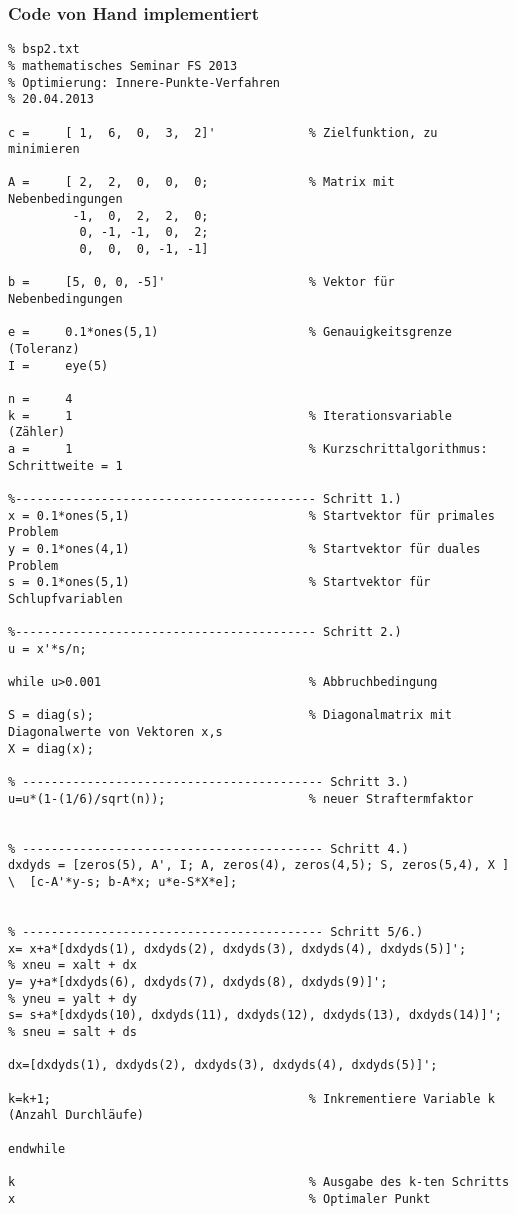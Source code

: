 \subsubsection{Code von Hand implementiert}
\begin{verbatim}
% bsp2.txt
% mathematisches Seminar FS 2013
% Optimierung: Innere-Punkte-Verfahren
% 20.04.2013

c =     [ 1,  6,  0,  3,  2]'             % Zielfunktion, zu minimieren

A =     [ 2,  2,  0,  0,  0;              % Matrix mit Nebenbedingungen
         -1,  0,  2,  2,  0;
          0, -1, -1,  0,  2;
          0,  0,  0, -1, -1]

b =     [5, 0, 0, -5]'                    % Vektor für Nebenbedingungen

e =     0.1*ones(5,1)                     % Genauigkeitsgrenze (Toleranz)																											
I =     eye(5)	

n =     4														
k =     1                                 % Iterationsvariable (Zähler)
a =     1                                 % Kurzschrittalgorithmus: Schrittweite = 1

%------------------------------------------ Schritt 1.)
x = 0.1*ones(5,1)                         % Startvektor für primales Problem
y = 0.1*ones(4,1)                         % Startvektor für duales Problem
s = 0.1*ones(5,1)                         % Startvektor für Schlupfvariablen

%------------------------------------------ Schritt 2.)
u = x'*s/n;

while u>0.001                             % Abbruchbedingung	

S = diag(s);                              % Diagonalmatrix mit Diagonalwerte von Vektoren x,s
X = diag(x);

% ------------------------------------------ Schritt 3.)
u=u*(1-(1/6)/sqrt(n));                    % neuer Straftermfaktor


% ------------------------------------------ Schritt 4.)
dxdyds = [zeros(5), A', I; A, zeros(4), zeros(4,5); S, zeros(5,4), X ]  \  [c-A'*y-s; b-A*x; u*e-S*X*e];


% ------------------------------------------ Schritt 5/6.)
x= x+a*[dxdyds(1), dxdyds(2), dxdyds(3), dxdyds(4), dxdyds(5)]';      % xneu = xalt + dx 
y= y+a*[dxdyds(6), dxdyds(7), dxdyds(8), dxdyds(9)]';                 % yneu = yalt + dy 
s= s+a*[dxdyds(10), dxdyds(11), dxdyds(12), dxdyds(13), dxdyds(14)]'; % sneu = salt + ds 

dx=[dxdyds(1), dxdyds(2), dxdyds(3), dxdyds(4), dxdyds(5)]';

k=k+1;                                    % Inkrementiere Variable k (Anzahl Durchläufe)

endwhile

k                                         % Ausgabe des k-ten Schritts
x                                         % Optimaler Punkt
\end{verbatim}


